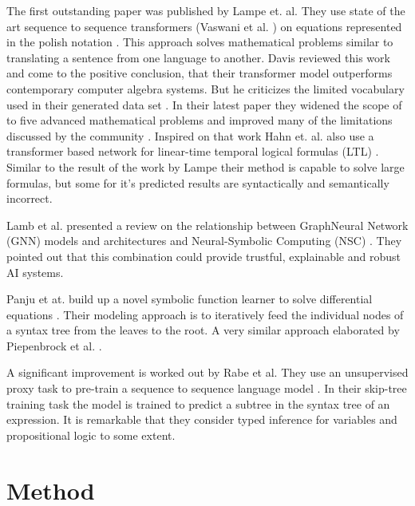 \documentclass{scrartcl}
\theoremstyle{definition}
\begin{document}
The first outstanding paper was published by Lampe et. al.
They use state of the art sequence to sequence transformers (Vaswani et al. \cite{vaswani2017attention}) on equations represented in the polish notation \cite{Lample2020Deep}.
This approach solves mathematical problems similar to translating a sentence from one language to another. 
Davis reviewed this work and come to the positive conclusion, that their transformer model outperforms contemporary computer algebra systems.
But he criticizes the limited vocabulary used in their generated data set \cite{davis2019use}.
In their latest paper they widened the scope of to five advanced mathematical problems and improved many of the limitations discussed by the community \cite{charton2021learning}.
Inspired on that work Hahn et. al. also use a transformer based network for linear-time temporal logical formulas (LTL) \cite{hahn2021teaching}.
Similar to the result of the work by Lampe their method is capable to solve large formulas, but some for it's predicted results are syntactically and semantically incorrect.

Lamb et al. presented a review on the relationship between GraphNeural Network (GNN) models and architectures and Neural-Symbolic Computing (NSC) \cite{lamb2020graph}.
They pointed out that this combination could provide trustful, explainable and robust AI systems.

Panju et at. build up a novel symbolic function learner to solve differential equations \cite{panju2020neurosymbolic}.
Their modeling approach is to iteratively feed the individual nodes of a syntax tree from the leaves to the root.
A very similar approach elaborated by Piepenbrock et al. \cite{piepenbrock2021learning}. 

A significant improvement is worked out by Rabe et al. They use an unsupervised proxy task to pre-train a sequence to sequence language model \cite{rabe2020mathematical}.
In their skip-tree training task the model is trained to predict a subtree in the syntax tree of an expression.
It is remarkable that they consider typed inference for variables and propositional logic to some extent.


\section{Method}
\end{document}
